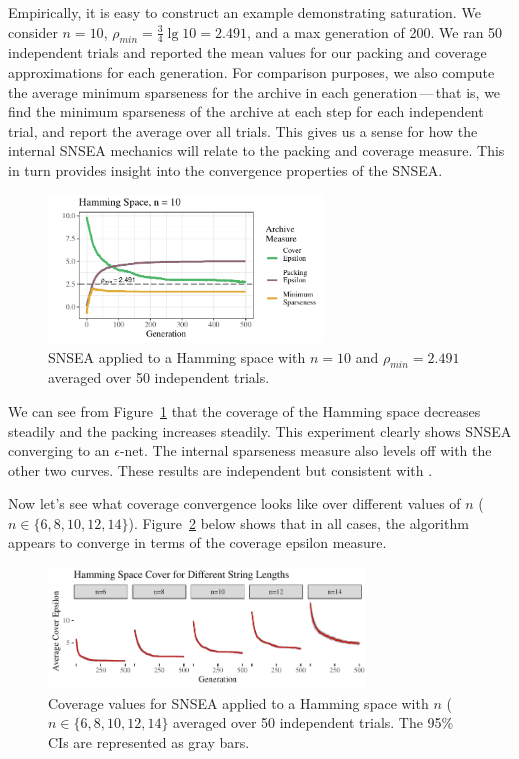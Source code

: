 \documentclass[twoside]{article}
\begin{document}
Empirically, it is easy to construct an example demonstrating saturation.  We consider $n=10$, $\rho_{min} = \frac{3}{4} \lg 10 = 2.491$, and a max generation of 200.  We ran 50 independent trials and reported the mean values for our packing and coverage approximations for each generation.  For comparison purposes, we also compute the average minimum sparseness for the archive in each generation\,---\,that is, we find the minimum sparseness of the archive at each step for each independent trial, and report the average over all trials.  This gives us a sense for how the internal SNSEA mechanics will relate to the packing and coverage measure.  This in turn provides insight into the convergence properties of the SNSEA.
%
\begin{figure}[ht]
  \center\includegraphics[width=0.65\textwidth]{Figures/hamming-500-n10-NOPOP.pdf}
  \caption{\label{fig:hamming:nopop:n10} SNSEA applied to a Hamming space with $n=10$ and $\rho_{min} = 2.491$ averaged over 50 independent trials.}
\end{figure}

We can see from Figure~\ref{fig:hamming:nopop:n10} that the coverage of the Hamming space decreases steadily and the packing increases steadily.  This experiment clearly shows SNSEA converging to an $\epsilon$-net.  The internal sparseness measure also levels off with the other two curves.  These results are independent but consistent with \citep{Wiegand2020flairs}.  

Now let's see what coverage convergence looks like over different values of $n$ ($n\in\{6, 8, 10, 12, 14\}$).  Figure~\ref{fig:hamming:nopop:sm} below shows that in all cases, the algorithm appears to converge in terms of the coverage epsilon measure.
%
\begin{figure}[ht]
  \center\includegraphics[width=0.75\textwidth]{Figures/hamming-500sm-NOPOP.pdf}
  \caption{\label{fig:hamming:nopop:sm} Coverage values for SNSEA applied to a Hamming space with $n$ ($n\in\{6, 8, 10, 12, 14\}$ averaged over 50 independent trials.  The 95\% CIs are represented as gray bars.}
\end{figure}
\end{document}
